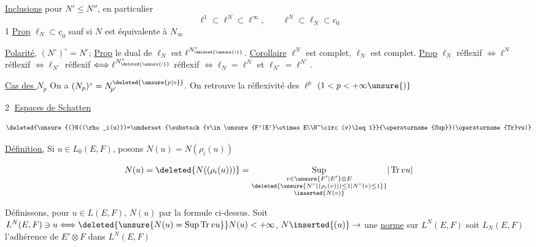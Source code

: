 \uline{Inclusions} pour $N'\leq N''$, en particulier
\[
\ell^1\subset\ell^N\subset\ell^\infty,\qquad \ell^N\subset\ell_N\subset c_0
\]
1 \uline{Prop} $\ell_N\subset\underline c_0$ sauf si $N$ est équivalente à $N_\infty$

\uline{Polarité}, $(N^\circ)^\circ=N^\circ$; \uline{Prop} le dual de $\ell_N$ est $\ell^{N^{\circ}_{\deleted{\unsure{\prime}}}}$. \uline{Corollaire} $\ell^N$ est complet, $\ell_N$ est complet. \uline{Prop} $\ell_N$ réflexif $\Longleftrightarrow\ell^N$ réflexif $\Longleftrightarrow\ell_{N^\circ}$ réflexif $\Longleftrightarrow\ell^{N^{\circ}_{\deleted{\unsure{\prime}}}}$ réflexif $\Longleftrightarrow\ell_N=\ell^N$ et $\ell_{N^\circ}=\ell^{N^\circ}$.

 \uline{Cas des $N_p$} On a $(N_p)^\circ=N_{\!p'}^{\deleted{\unsure{p|\circ}}}$. On retrouve la réflexivité des $\ell^p$ $(1<p<+\infty\unsure{)}$

\textcircled{2} \uline{Espaces de Schatten}



\[
\deleted{\unsure{(}N((\rho_i(u)))=\underset{\substack{v\in\unsure{F'|E'}\otimes E\\N^\circ(v)\leq 1}}{\operatorname{Sup}}|\operatorname{Tr}vu|}
\]

\uline{Définition,} Si $u\in L_0(E,F)$, posons $N(u)=N(\rho_i(u))$

\[
N(u)=\deleted{N((\rho_i(u)))}=\underset{\substack{v\in\unsure{F'|E'}\otimes E\\\deleted{\unsure{N^\circ((\rho_i(v)))\leq 1|N^\circ(v)\leq1}}\\\inserted{N(v)}}}{\operatorname{Sup}}|\operatorname{Tr}vu|
\]

Définissons, pour $u\in L(E,F)$, $N(u)$ par la formule ci-dessus. Soit $L^N(E,F)\ni u\Longleftrightarrow\deleted{\unsure{N(u)=\operatorname{Sup}\operatorname{Tr}vu}}N(u)<+\infty$, $N\inserted{(u)}\to$ une \uline{norme} sur $L^N(E,F)$  soit $L_N(E,F)$ l'adhérence de $E'\otimes F$ dans $L^N(E,F)$

